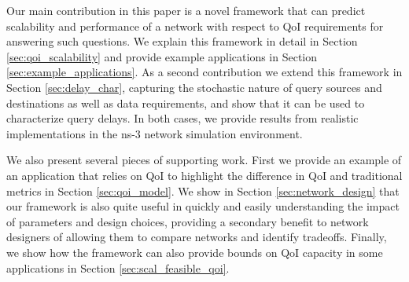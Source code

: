 Our main contribution in this paper is a novel framework that can predict scalability and performance of a network with respect to QoI requirements for answering such questions.  We explain this framework in detail in Section \ref{sec:qoi_scalability} and provide example applications in Section \ref{sec:example_applications}.  As a second contribution we extend this framework in Section \ref{sec:delay_char}, capturing the stochastic nature of query sources and destinations as well as data requirements, and show that it can be used to characterize query delays.  In both cases, we provide results from realistic implementations in the ns-3 network simulation environment.  

We also present several pieces of supporting work.  First we provide an example of an application that relies on QoI to highlight the difference in QoI and traditional metrics in Section \ref{sec:qoi_model}.  We show in Section \ref{sec:network_design} that our framework is also quite useful in quickly and easily understanding the impact of parameters and design choices, providing a secondary benefit to network designers of allowing them to compare networks and identify tradeoffs.  Finally, we show how the framework can also provide bounds on QoI capacity in some applications in Section \ref{sec:scal_feasible_qoi}.




